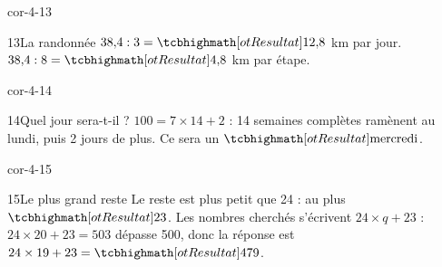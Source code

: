 \begin{blocLivre}{cor-4-13}\begin{corrige}{13}{La randonnée}
$38{,}4:3=\res{12{,}8}$ km par jour. $38{,}4:8=\res{4{,}8}$ km par étape.
\end{corrige}\end{blocLivre}
\begin{blocLivre}{cor-4-14}\begin{corrige}{14}{Quel jour sera-t-il ?}
$100=7\times14+2$ : 14 semaines complètes ramènent au lundi, puis 2 jours de plus. Ce sera un $\res{\text{mercredi}}$.
\end{corrige}\end{blocLivre}
\begin{blocLivre}{cor-4-15}\begin{corrige}{15}{Le plus grand reste}
Le reste est plus petit que 24 : au plus $\res{23}$. Les nombres cherchés s’écrivent $24\times q+23$ : $24\times20+23=503$ dépasse 500, donc la réponse est $24\times19+23=\res{479}$.
\end{corrige}\end{blocLivre}
